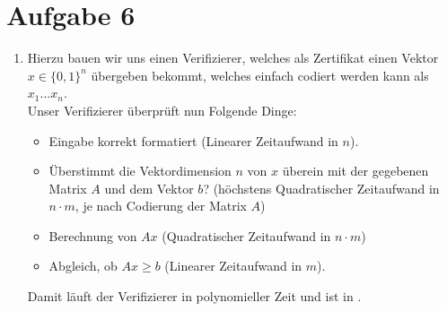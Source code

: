\documentclass[a4paper,11pt]{scrartcl}
\begin{document}
	\section*{Aufgabe 6}
	\begin{enumerate}[label=(\alph*)]
	\item
		Hierzu bauen wir uns einen Verifizierer, welches als Zertifikat einen Vektor $x \in \{0,1\}^n$ übergeben bekommt, welches einfach codiert werden kann als $x_1 ... x_n$.\\
		Unser Verifizierer überprüft nun Folgende Dinge:
		\begin{itemize}
		\item	Eingabe korrekt formatiert (Linearer Zeitaufwand in $n$).
		\item	Überstimmt die Vektordimension $n$ von $x$ überein mit der gegebenen Matrix $A$ und dem Vektor $b$? (höchstens Quadratischer Zeitaufwand in $n \cdot m$, je nach Codierung der Matrix $A$)
		\item	Berechnung von $Ax$ (Quadratischer Zeitaufwand in $n \cdot m$)
		\item	Abgleich, ob $Ax \geq b$ (Linearer Zeitaufwand in $m$).
		\end{itemize}
		Damit läuft der Verifizierer in polynomieller Zeit und  ist in .
		

\end{enumerate}
\end{document}
